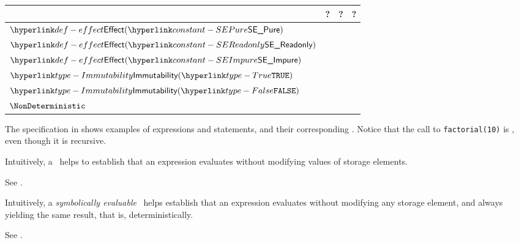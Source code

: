 \begin{center}
\begin{tabular}{llll}
\textbf{\sideeffectdescriptorterm{}} & \textbf{\pureterm{}?} & \textbf{\readonlyterm{}?} & \textbf{\symbolicallyevaluableterm{}?}\\
\hline
$\Effect(\SEPure)$      & \True{}  & \True{}  & \True{}  \\
$\Effect(\SEReadonly)$  & \False{} & \True{}  & \True{}  \\
$\Effect(\SEImpure)$    & \False{} & \False{} & \False{} \\
$\Immutability(\True)$  & \True{}  & \True{}  & \True{}  \\
$\Immutability(\False)$ & \False{} & \True{}  & \False{} \\
$\NonDeterministic$      & \False{} & \True{}  & \False{} \\
\end{tabular}
\end{center}

The specification in  shows examples of expressions
and statements, and their corresponding \sideeffectdescriptorsterm{}.
Notice that the call to \verb|factorial(10)| is \readonlyterm, even though it is recursive.



Intuitively, a \emph{\readonlyterm} \sideeffectdescriptorterm\ helps to establish that
an expression evaluates without modifying values of storage elements.

See .


Intuitively, a \emph{symbolically evaluable} \sideeffectdescriptorterm\ helps establish that
an expression evaluates without modifying any storage element,
and always yielding the same result, that is, deterministically.

See .

